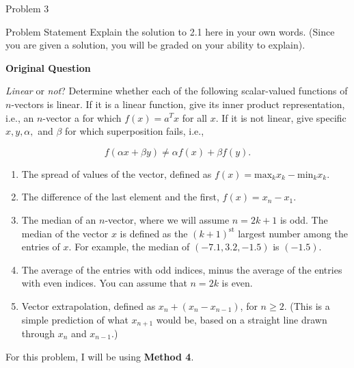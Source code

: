 \begin{problem}{Problem 3}
    \begin{statement}{Problem Statement}
        Explain the solution to 2.1 here in your own words. (Since you are given a solution, you will be graded on your ability to explain). \vspace*{1em}

        \textbf{Original Question} \vspace*{1em}

        \textit{Linear} or \textit{not}? Determine whether each of the following scalar-valued functions of $n$-vectors is linear. If it is a linear function, give its inner product representation, 
        i.e., an $n$-vector a for which $f(x)=a^{T}x$ for all $x$. If it is not linear, give specific $x, y, \alpha,$ and $\beta$ for which superposition fails, i.e.,

        \begin{equation*}
            f(\alpha x + \beta y) \neq \alpha f(x) + \beta f(y).
        \end{equation*}

        \begin{enumerate}[label=(\alph*)]
            \item The spread of values of the vector, defined as $f(x) = \text{max}_{k}x_{k} - \text{min}_{k}x_{k}$.
            \item The difference of the last element and the first, $f(x) = x_{n}-x_{1}$.
            \item The median of an $n$-vector, where we will assume $n = 2k + 1$ is odd. The median of the vector $x$ is defined as the $(k+1)^{\text{st}}$ largest number among the entries of $x$.
            For example, the median of $(-7.1,3.2,-1.5)$ is $(-1.5)$.
            \item The average of the entries with odd indices, minus the average of the entries with even indices. You can assume that $n = 2k$ is even.
            \item Vector extrapolation, defined as $x_{n} + (x_{n}-x_{n-1})$, for $n \geq 2$. (This is a simple prediction of what $x_{n+1}$ would be, based on a straight line drawn through $x_{n}$
            and $x_{n-1}$.)
        \end{enumerate}
    \end{statement}

    \begin{Highlight}
        For this problem, I will be using \textbf{Method 4}. \vspace*{1em}


\end{Highlight}
\end{problem}
